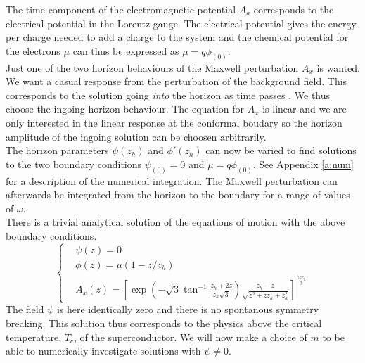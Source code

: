 \documentclass[12pt]{report}
\renewcommand{\i}{\ensuremath{i}}
\newcommand{\At}{\ensuremath{{\phi}}}
\begin{document}
The time component of the electromagnetic potential $A_a$ corresponds to the electrical potential in the Lorentz gauge. The electrical potential gives the energy per charge needed to add a charge to the system and the chemical potential for the electrons $\mu$ can thus be expressed as $\mu=q\phi_{(0)}$.\\

Just one of the two horizon behaviours of the Maxwell perturbation $A_x$ is wanted. We want a casual response from the perturbation of the background field. This corresponds to the solution going \emph{into} the horizon as time passes \cite{hartnoll8}. We thus choose the ingoing horizon behaviour. The equation for $A_x$ is linear and we are only interested in the linear response at the conformal boudary so the horizon amplitude of the ingoing solution can be choosen arbitrarily.\\

The horizon parameters $\psi(z_h)$ and $\At'(z_h)$ can now be varied to find solutions to the two boundary conditions $\psi_{(0)}=0$ and $\mu=q\phi_{(0)}$. See Appendix \ref{a:num} for a description of the numerical integration. The Maxwell perturbation can afterwards be integrated from the horizon to the boundary for a range of values of $\omega$.\\

There is a trivial analytical solution of the equations of motion with the above boundary conditions.
\begin{equation}
\begin{cases} 
 &\psi(z)=0\\
 &\phi(z)=\mu(1-z/z_h)\\
 &A_x(z)=
\left[
\exp\left( - \sqrt{3}\tan^{-1} \frac{z_h+2z}{z_h\sqrt{3}} \right)
\frac{z_h-z}{\sqrt{z^2+zz_h+z_h^2}}
\right]^{\frac{\i\omega z_h}{3} }   \label{trivial}
\end{cases}
\end{equation}
The field $\psi$ is here identically zero and there is no spontanous symmetry breaking. This solution thus corresponds to the physics above the critical temperature, $T_c$, of the superconductor. We will now make a choice of $m$ to be able to numerically investigate solutions with $\psi\neq0$.
\end{document}
